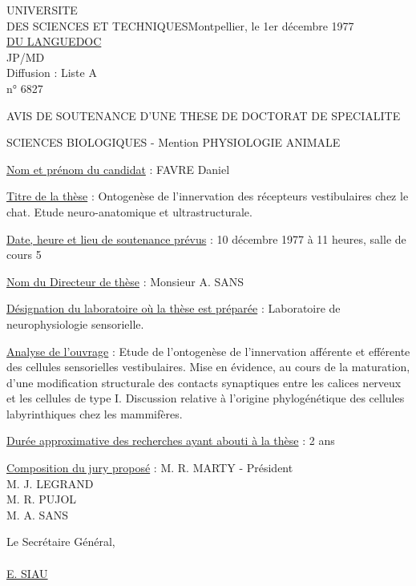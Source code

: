 UNIVERSITE\\
DES SCIENCES ET TECHNIQUES\hfill Montpellier, le 1er décembre 1977\\
\uline{DU LANGUEDOC}\\
JP/MD\\
Diffusion : Liste A\\
n° 6827

AVIS DE SOUTENANCE D'UNE THESE DE DOCTORAT DE SPECIALITE

SCIENCES BIOLOGIQUES - Mention PHYSIOLOGIE ANIMALE

\uline{Nom et prénom du candidat} : FAVRE Daniel

\uline{Titre de la thèse} : Ontogenèse de l'innervation des récepteurs vestibulaires chez le chat. Etude neuro-anatomique et ultrastructurale.

\uline{Date, heure et lieu de soutenance prévus} : 10 décembre 1977 à 11 heures, salle de cours 5

\uline{Nom du Directeur de thèse} : Monsieur A. SANS

\uline{Désignation du laboratoire où la thèse est préparée} : Laboratoire de neurophysiologie sensorielle.

\uline{Analyse de l'ouvrage} : Etude de l'ontogenèse de l'innervation afférente et efférente des cellules sensorielles vestibulaires. Mise en évidence, au cours de la maturation, d'une modification structurale des contacts synaptiques entre les calices nerveux et les cellules de type I. Discussion relative à l'origine phylogénétique des cellules labyrinthiques chez les mammifères.

\uline{Durée approximative des recherches ayant abouti à la thèse} : 2 ans

\uline{Composition du jury proposé} : M. R. MARTY - Président\\
M. J. LEGRAND\\
M. R. PUJOL\\
M. A. SANS

Le Secrétaire Général,\\
\\
\uline{E. SIAU}

